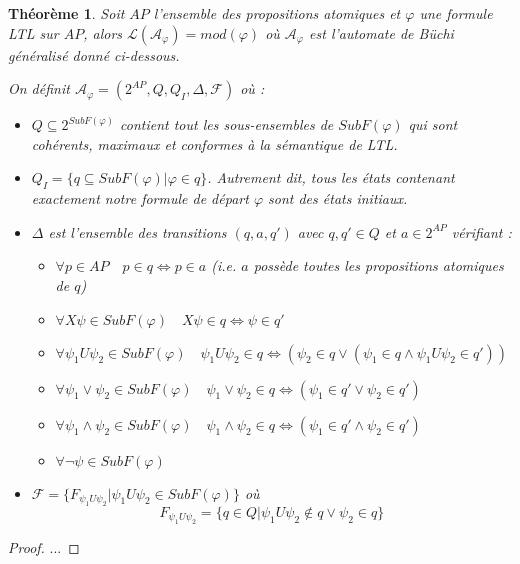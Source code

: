\documentclass[12pt,a4paper]{article}
\theoremstyle{plain}
\newtheorem{thm}{Théorème}
\theoremstyle{definition}
\begin{document}
\begin{thm}
  Soit $AP$ l'ensemble des propositions atomiques et $\varphi$ une formule LTL sur $AP$, alors $\mathcal{L}(\mathcal{A}_\varphi) = mod(\varphi)$
  où $\mathcal{A}_\varphi$ est l'automate de Büchi généralisé donné ci-dessous.

  On définit $\mathcal{A}_\varphi = (2^{AP}, Q, Q_I, \Delta, \mathscr{F})$ où :
  \begin{itemize}
  \item $Q \subseteq 2^{SubF(\varphi)}$ contient tout les sous-ensembles de $SubF(\varphi)$ qui sont cohérents, maximaux et conformes à la sémantique de LTL.
  \item $Q_I = \{ q \subseteq SubF(\varphi) | \varphi \in q \}$. Autrement dit, tous les états contenant exactement notre formule de départ $\varphi$ sont des états initiaux.
  \item $\Delta$ est l'ensemble des transitions $(q, a, q')$ avec $q, q' \in Q$ et $a \in 2^{AP}$ vérifiant :
    \begin{itemize}
    \item $\forall p \in AP \quad p \in q \iff p \in a$ (i.e. $a$ possède toutes les propositions atomiques de $q$)
    \item $\forall X\psi \in SubF(\varphi) \quad X\psi \in q \iff \psi \in q'$
    \item $\forall \psi_1 U \psi_2 \in SubF(\varphi) \quad \psi_1 U \psi_2 \in q \iff \left( \psi_2 \in q \lor (\psi_1 \in q \land \psi_1 U \psi_2 \in q')\right)$
    \item $\forall \psi_1 \lor \psi_2 \in SubF(\varphi) \quad \psi_1 \lor \psi_2 \in q \iff (\psi_1 \in q' \lor \psi_2 \in q')$
    \item $\forall \psi_1 \land \psi_2 \in SubF(\varphi) \quad \psi_1 \land \psi_2 \in q \iff (\psi_1 \in q' \land \psi_2 \in q')$
    \item $\forall \lnot \psi \in SubF(\varphi)$
    \end{itemize}
  \item $\mathscr{F} = \{F_{\psi_1 U \psi_2} | \psi_1 U \psi_2 \in SubF(\varphi)\}$ où
    \[
      F_{\psi_1 U \psi_2} = \{q \in Q | \psi_1 U \psi_2 \not \in q \lor \psi_2\in q \}
    \]
  \end{itemize}
\end{thm}

\begin{proof}
  ...
\end{proof}
\end{document}
